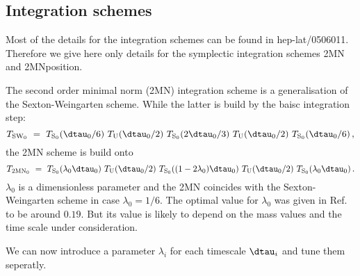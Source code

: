 \subsection{Integration schemes}
\label{sec:integrators}

Most of the details for the integration schemes can be found in
{\ttfamily hep-lat/0506011}. Therefore we give here only details for
the symplectic integration schemes {\ttfamily 2MN} and {\ttfamily
  2MNposition}. 

The second order minimal norm (2MN) integration scheme is a
generalisation of the Sexton-Weingarten scheme. While the latter is
build by the baisc integration step:
\begin{equation}
  \label{int:0}
  T_{\mathrm{SW}_0}\ =\ T_{\mathrm{S}_0}(\dtau_0/6)\
  T_\mathrm{U}(\dtau_0/2)\ T_{\mathrm{S}_0}(2\dtau_0/3)\
  T_\mathrm{U}(\dtau_0/2)\ T_{\mathrm{S}_0}(\dtau_0/6)\, ,
\end{equation}
the 2MN scheme is build onto
\begin{equation}
  \label{int:1}
  T_{\mathrm{2MN}_0}\ =\ T_{\mathrm{S}_0}(\lambda_0\dtau_0)\
  T_\mathrm{U}(\dtau_0/2)\ T_{\mathrm{S}_0}((1-2\lambda_0)\dtau_0)\
  T_\mathrm{U}(\dtau_0/2)\ T_{\mathrm{S}_0}(\lambda_0\dtau_0)\, .
\end{equation}
$\lambda_0$ is a dimensionless parameter and the 2MN coincides with
the Sexton-Weingarten scheme in case $\lambda_0=1/6$. The optimal
value for $\lambda_0$ was given in Ref.~\cite{Takaishi:2005tz} to be
around $0.19$. But its value is likely to depend on the mass values
and the time scale under consideration.

We can now introduce a parameter $\lambda_i$ for each timescale
$\dtau_i$ and tune them seperatly.

